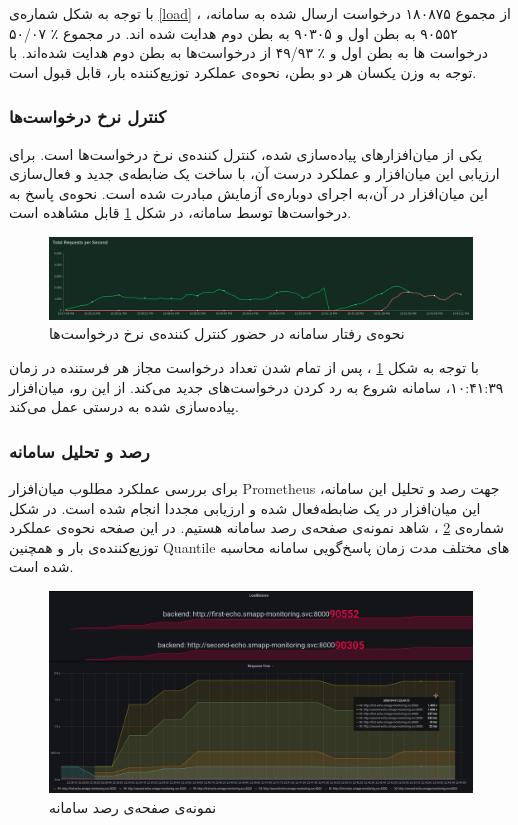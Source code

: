با توجه به شکل شماره‌ی
\ref{load}
، از مجموع ۱۸۰۸۷۵ درخواست ارسال شده به سامانه، ۹۰۵۵۲ به بطن اول و ۹۰۳۰۵ به بطن دوم هدایت شده اند. در مجموع ٪ ۵۰/۰۷ درخواست ها به بطن اول و ٪ ۴۹/۹۳ از درخواست‌ها به بطن دوم هدایت شده‌اند. با توجه به وزن یکسان هر دو بطن، نحوه‌ی عملکرد توزیع‌کننده بار، قابل قبول است.


\subsubsection{کنترل نرخ درخواست‌ها}
یکی از میان‌افزار‌های پیاده‌سازی شده، کنترل کننده‌ی نرخ درخواست‌ها است. برای ارزیابی این میان‌افزار و عملکرد درست آن، با ساخت یک ضابطه‌ی جدید و فعال‌سازی این میان‌افزار در آن،‌به اجرای دوباره‌ی آزمایش مبادرت شده است. نحوه‌ی پاسخ به درخواست‌ها توسط سامانه، در شکل
\ref{rate}
قابل مشاهده است.

\begin{figure}[H]
    \centering
    \caption{نحوه‌ی رفتار سامانه در حضور کنترل کننده‌ی نرخ درخواست‌ها}
    \label{rate}
    \includegraphics[scale=0.23]{images/RatelimitStats.png}
\end{figure}

با توجه به شکل
\ref{rate}
،‌ پس از تمام شدن تعداد درخواست مجاز هر فرستنده در زمان ۱۰:۴۱:۳۹، سامانه شروع به رد کردن درخواست‌های جدید می‌کند. از این رو، میان‌افزار پیاده‌سازی شده به درستی عمل می‌کند.

\subsubsection{رصد و تحلیل سامانه}
برای بررسی عملکرد مطلوب میان‌افزار Prometheus جهت رصد و تحلیل این سامانه، این میان‌افزار در یک ضابطه‌فعال شده و ارزیابی مجددا انجام شده است. در شکل شماره‌ی
\ref{monitoring}
، شاهد نمونه‌ی صفحه‌ی رصد سامانه هستیم. در این صفحه نحوه‌ی عملکرد توزیع‌کننده‌ی بار و همچنین Quantile های مختلف مدت زمان پاسخ‌گویی سامانه محاسبه شده است.

\begin{figure}[H]
    \centering
    \caption{نمونه‌ی صفحه‌ی رصد سامانه}
    \label{monitoring}
    \includegraphics[scale=0.23]{images/Stats.png}
\end{figure}


\cleardoublepage 